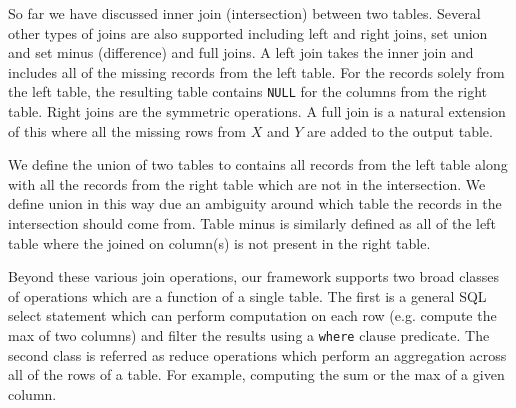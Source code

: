 So far we have discussed inner join (intersection) between two tables. Several other types of joins are also supported including left and right joins, set union and set minus (difference) and full joins. A left join takes the inner join and includes all of the missing records from the left table. For the records solely from the left table, the resulting table contains \texttt{NULL} for the columns from the right table. Right joins are the symmetric operations. A full join is a natural extension of this where all the missing rows from $X$ and $Y$ are added to the output table.

We define the union of two tables to contains all records from the left table along with all the records from the right table which are not in the intersection. We define union in this way due an ambiguity around which table the records in the intersection should come from. Table minus is similarly defined as all of the left table where the joined on column(s) is not present in the right table. 

Beyond these various join operations, our framework supports two broad classes of operations which are a function of a single table. The first is a general SQL select statement which can perform computation on each row (e.g. compute the max of two columns) and filter the results using a \texttt{where} clause predicate. The second class is referred as reduce operations which perform an aggregation across all of the rows of a table. For example, computing the sum or the max of a given column. 


